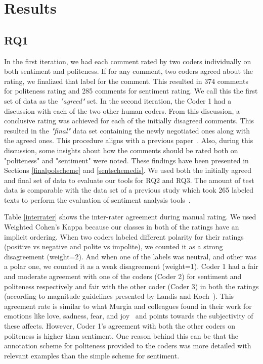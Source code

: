  
\section{Results}

\subsection{RQ1 }\label{gt}

In the first iteration, 
we had each comment rated by two coders individually 
on both sentiment and politeness. 
If for any comment, 
two coders agreed about the rating, 
we finalized that label for the comment. 
This resulted in 374 comments for politeness rating 
and 285 comments for sentiment rating. 
We call this the first set of data as the \textit{"agreed"} set.
In the second iteration, 
the Coder 1 had a discussion 
with each of the two other human coders. 
From this discussion, 
a conclusive rating was achieved 
for each of the initially disagreed comments. 
This resulted in the \textit{"final" }data set 
containing the newly negotiated ones along with the agreed ones. 
This procedure aligns with a previous paper~\cite{ahmed2017senticr}. Also, during this discussion, 
some insights about how the comments should be rated 
both on "politeness" and "sentiment" were noted. 
These findings have been presented in Sections \ref{finalpolscheme} and \ref{sentschemedis}.
We used both the initially agreed and final set of data 
to evaluate our tools for RQ2 and RQ3. 
The amount of test data is comparable 
with the data set of a previous study 
which took 265 labeled texts to 
perform the evaluation of sentiment analysis tools~\cite{jongeling2017negative}.

Table \ref{interrater} shows the inter-rater agreement
during manual rating. 
We used Weighted Cohen's Kappa 
because our classes in both of the ratings 
have an implicit ordering. 
When two coders labeled different polarity 
for their ratings 
(positive vs negative and polite vs impolite), 
we counted it as a strong disagreement (weight=2). 
And when one of the labels was neutral, 
and other was a polar one, 
we counted it as a weak disagreement (weight=1).
Coder 1 had a fair and moderate agreement 
with one of the coders (Coder 2) 
for sentiment and politeness respectively and 
fair with the other coder (Coder 3) in both the ratings 
(according to magnitude guidelines presented by Landis and Koch~\cite{landis1977measurement}). 
This agreement rate is similar to what 
Murgia and colleagues found in their work 
for emotions like love, sadness, fear, and joy~\cite{murgia2014developers} and 
points towards the subjectivity of these affects.
However, 
Coder 1's agreement with both the other coders
on politeness 
is higher than sentiment. 
One reason behind this can be 
that the annotation scheme for politeness 
provided to the coders 
was more detailed with relevant examples 
than the simple scheme for sentiment. 

